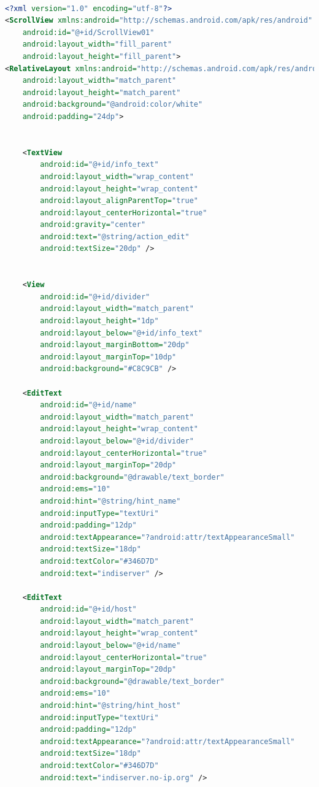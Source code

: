 \begin{lstlisting}[language=XML,caption={Vista de edición  XML de una propiedad},label={lst:xml_edit_view}]

<?xml version="1.0" encoding="utf-8"?>
<ScrollView xmlns:android="http://schemas.android.com/apk/res/android"
    android:id="@+id/ScrollView01"
    android:layout_width="fill_parent"
    android:layout_height="fill_parent">
<RelativeLayout xmlns:android="http://schemas.android.com/apk/res/android"
    android:layout_width="match_parent"
    android:layout_height="match_parent"
    android:background="@android:color/white"
    android:padding="24dp">


    <TextView
        android:id="@+id/info_text"
        android:layout_width="wrap_content"
        android:layout_height="wrap_content"
        android:layout_alignParentTop="true"
        android:layout_centerHorizontal="true"
        android:gravity="center"
        android:text="@string/action_edit"
        android:textSize="20dp" />


    <View
        android:id="@+id/divider"
        android:layout_width="match_parent"
        android:layout_height="1dp"
        android:layout_below="@+id/info_text"
        android:layout_marginBottom="20dp"
        android:layout_marginTop="10dp"
        android:background="#C8C9CB" />

    <EditText
        android:id="@+id/name"
        android:layout_width="match_parent"
        android:layout_height="wrap_content"
        android:layout_below="@+id/divider"
        android:layout_centerHorizontal="true"
        android:layout_marginTop="20dp"
        android:background="@drawable/text_border"
        android:ems="10"
        android:hint="@string/hint_name"
        android:inputType="textUri"
        android:padding="12dp"
        android:textAppearance="?android:attr/textAppearanceSmall"
        android:textSize="18dp"
        android:textColor="#346D7D"
        android:text="indiserver" />

    <EditText
        android:id="@+id/host"
        android:layout_width="match_parent"
        android:layout_height="wrap_content"
        android:layout_below="@+id/name"
        android:layout_centerHorizontal="true"
        android:layout_marginTop="20dp"
        android:background="@drawable/text_border"
        android:ems="10"
        android:hint="@string/hint_host"
        android:inputType="textUri"
        android:padding="12dp"
        android:textAppearance="?android:attr/textAppearanceSmall"
        android:textSize="18dp"
        android:textColor="#346D7D"
        android:text="indiserver.no-ip.org" />


\end{lstlisting}
